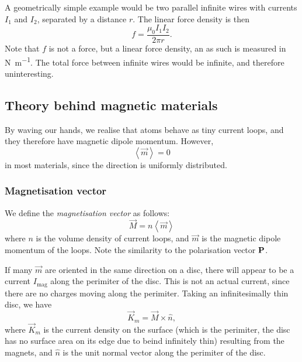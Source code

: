     A geometrically simple example would be two parallel infinite wires with currents $I_1$ and $I_2$, 
    separated by a distance $r$. The linear force density is then
    \begin{equation}
        f = \frac{\mu_0 I_1 I_2}{2\pi r}.
    \end{equation}
    Note that $f$ is not a force, but a linear force density, an as such is measured in \si{\newton\per\metre}. 
    The total force between infinite wires would be infinite, and therefore uninteresting.

\subsection{Theory behind magnetic materials}
    By waving our hands, we realise that atoms behave as tiny current loops, and they therefore have magnetic dipole momentum.
    However, 
    \begin{equation*}
        \left<\vec{m}\right> = 0
    \end{equation*}
    in most materials, since the direction is uniformly distributed. 

    \subsubsection{Magnetisation vector}
        We define the \textit{magnetisation vector} as follows:
        \begin{equation}
            \vec{M} = n\left<\vec{m}\right>
        \end{equation}
        where $n$ is the volume density of current loops, and $\vec{m}$ is the magnetic dipole momentum of the loops. 
        Note the similarity to the polarisation vector $\mathbf{P}$.

        If many $\vec{m}$ are oriented in the same direction on a disc, 
        there will appear to be a current $I_{\text{mag}}$ along the perimiter of the disc. 
        This is not an actual current, since there are no charges moving along the perimiter.
        Taking an infinitesimally thin disc, we have 
        \begin{equation}
            \vec{K}_{m} = \vec{M}\times\hat{n},
        \end{equation}
        where $\vec{K}_m$ is the current density on the surface 
        (which is the perimiter, the disc has no surface area on its edge due to beind infinitely thin) 
        resulting from the magnets, and $\hat{n}$ is the unit normal vector along the perimiter of the disc. 

